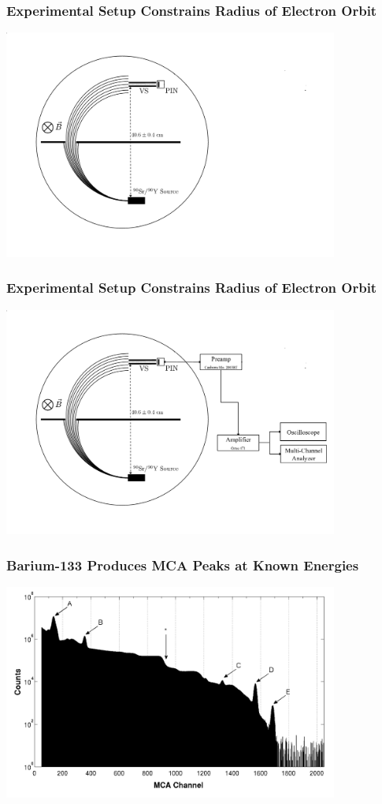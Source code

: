 \documentclass{beamer}
\begin{document}
\begin{frame}
  \frametitle{Experimental Setup Constrains Radius of Electron Orbit}
  \includegraphics[width=11cm]{setup2.png}
\end{frame}

\begin{frame}
  \frametitle{Experimental Setup Constrains Radius of Electron Orbit}
  \includegraphics[width=11cm]{setup3.png}
\end{frame}

\begin{frame}
  \frametitle{Barium-133 Produces MCA Peaks at Known Energies}
  \includegraphics[width=11cm]{calibration.png}
\end{frame}
\end{document}
